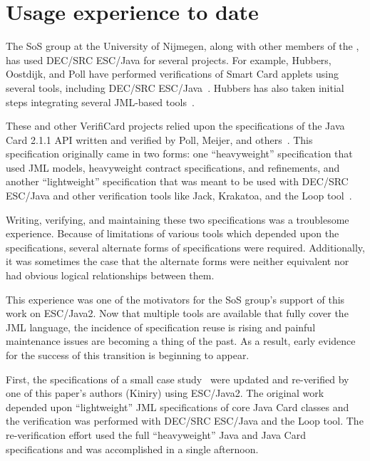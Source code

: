 \documentclass{sig-alternate}
\begin{document}
\section{Usage experience to date}
\label{sec:usage-exper-date}
The SoS group at the University of Nijmegen, along with other members
of the , has used DEC/SRC ESC/Java for several projects.  For
example, Hubbers, Oostdijk, and Poll have performed verifications of
Smart Card applets using several tools, including DEC/SRC
ESC/Java~\cite{HOP04}.  Hubbers has also taken initial steps
integrating several JML-based tools~\cite{Hub03}.

These and other VerifiCard projects relied upon the specifications of
the Java Card 2.1.1 API written and verified by Poll, Meijer, and
others~\cite{MeijerPoll01}.  This specification originally came in two
forms: one ``heavyweight'' specification that used JML models,
heavyweight contract specifications, and refinements, and another
``lightweight'' specification that was meant to be used with DEC/SRC
ESC/Java and other verification tools like Jack, Krakatoa, and the
Loop tool~\cite{BergJ01,BurdyRequet02,MarchePaulinMohringUrbain04}.

Writing, verifying, and maintaining these two specifications was a
troublesome experience.  Because of limitations of various tools which
depended upon the specifications, several alternate forms of
specifications were required.  Additionally, it was sometimes the case
that the alternate forms were neither equivalent nor had obvious
logical relationships between them.


This experience was one of the motivators for the SoS group's support
of this work on ESC/Java2.  Now that multiple tools are available that
fully cover the JML language, the incidence of specification reuse is
rising and painful maintenance issues are becoming a thing of the
past.  As a result, early evidence for the success of this transition is
beginning to appear.

First, the specifications of a small case
study~\cite{BreunesseJacobsBerg02} were updated and re-verified by one
of this paper's authors (Kiniry) using ESC/Java2.  The original work
depended upon ``light\-weight'' JML specifications of core Java Card classes
and the verification was performed with DEC/SRC ESC/Java and the Loop
tool.  The re-verification effort used the full ``heavyweight'' Java
and Java Card specifications and was accomplished in a single
afternoon.
\end{document}
